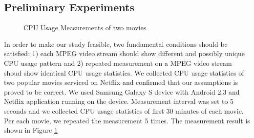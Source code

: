 \subsection{Preliminary Experiments}

\begin{figure}[!t]
	\centering
	\caption{CPU Usage Measurements of two movies}
	\label{fig:preliminaries}
	\vspace{-5mm}
\end{figure}

In order to make our study feasible, two fundamental conditions should be satisfied: 1) each MPEG video stream should show different and possibly unique CPU usage pattern and 2) repeated measurement on a MPEG video stream shoud show identical CPU usage statistics. 
We collected CPU usage statistics of two popular movies serviced on Netflix and confirmed that our assumptions is proved to be correct.
We used Samsung Galaxy S device with Android 2.3 and Netflix application running on the device. 
Measurement interval was set to 5 seconds and we collected CPU usage statistics of first 30 minutes of each movie. 
Per each movie, we repeated the measurement 5 times. 
The measurement result is shown in Figure \ref{fig:preliminaries}

